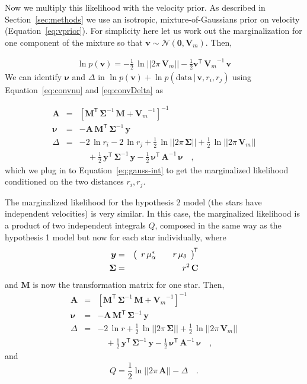 \documentclass[manuscript, letterpaper]{aastex6}
\newcommand{\sectionname}{Section}
\newcommand{\eqname}{Equation}
\newcommand{\given}{\,|\,}
\newcommand{\normal}{{\mathcal{N}}}
\newcommand{\transp}[1]{{#1}^{\!\mathsf{T}}}
\newcommand{\inv}[1]{{#1}^{-1}}
\newcommand{\bs}[1]{\boldsymbol{#1}}
\newcommand{\mat}[1]{\mathbf{#1}}
\renewcommand{\vec}[1]{\bs{#1}}
\newcommand{\data}{\mathrm{data}}
\begin{document}
Now we multiply this likelihood with the velocity prior.
As described in \sectionname~\ref{sec:methods}
we use an isotropic, mixture-of-Gaussians prior on velocity (\eqname~\ref{eq:vprior}).
For simplicity here let us work out the marginalization for one component of
the mixture so that $\vec{v} \sim \normal(\vec{0}, \mat{V}_m)$.
Then,

\begin{eqnarray}
  \ln p(\vec{v}) = -\frac{1}{2}\,\ln||2\pi\,\mat{V}_m||
  -\frac{1}{2} \transp{\vec{v}}\,\inv{\mat{V}_m}\,\vec{v}
\end{eqnarray}
We can identify $\vec{\nu}$ and $\Delta$ in
$\ln p(\vec{v}) + \ln p(\data \given \vec{v}, r_i, r_j)$
using \eqname~\ref{eq:convnu} and \ref{eq:convDelta} as

\begin{eqnarray}
  \mat{A} &=& \inv{[\transp{\mat{M}}\,\inv{\mat{\Sigma}}\,\mat{M}+\inv{\mat{V}_m}]}
  \\
  \vec{\nu} &=& -\mat{A}\,\transp{\mat{M}}\,\inv{\mat{\Sigma}}\,\vec{y}
  \\
  \Delta &=& -2\,\ln r_i -2\,\ln r_j
    +\frac{1}{2}\,\ln||2\pi\,\mat{\Sigma}|| +\frac{1}{2}\,\ln||2\pi\,\mat{V}_m|| \nonumber \\
    && \quad +\frac{1}{2}\,\transp{\vec{y}}\,\inv{\mat{\Sigma}}\,\vec{y} -\frac{1}{2}\,\transp{\vec{\nu}}\,\inv{\mat{A}}\,\vec{\nu}
  \quad ,
\end{eqnarray}
which we plug in to \eqname~\ref{eq:gauss-int} to get the marginalized
likelihood conditioned on the two distances $r_i, r_j$.

The marginalized likelihood for the hypothesis 2 model (the stars have
independent velocities) is very similar.
In this case, the marginalized likelihood is a product of two independent
integrals $Q$, composed in the same way as the hypothesis 1 model but now for
each star individually, where
\begin{eqnarray}
  \vec{y} &=&
    \transp{\left(
      \begin{array}{c c}
        r\,\mu_{\alpha}^* & \quad
        r\,\mu_{\delta}
      \end{array}
    \right)}
  \\
  \mat{\Sigma} &=& r^2 \, \mat{C}
  \\
\end{eqnarray}
and $\mat{M}$ is now the transformation matrix for one star. Then,
\begin{eqnarray}
  \mat{A} &=& \inv{[\transp{\mat{M}}\,\inv{\mat{\Sigma}}\,\mat{M}+\inv{\mat{V}_m}]}
  \\
  \vec{\nu} &=& -\mat{A}\,\transp{\mat{M}}\,\inv{\mat{\Sigma}}\,\vec{y}
  \\
  \Delta &=& -2\,\ln r
    +\frac{1}{2}\,\ln||2\pi\,\mat{\Sigma}|| +\frac{1}{2}\,\ln||2\pi\,\mat{V}_m|| \nonumber \\
    && \quad +\frac{1}{2}\,\transp{\vec{y}}\,\inv{\mat{\Sigma}}\,\vec{y} -\frac{1}{2}\,\transp{\vec{\nu}}\,\inv{\mat{A}}\,\vec{\nu}
  \quad ,
\end{eqnarray}
and
\begin{equation}
  Q = \frac{1}{2}\ln ||2\pi\,\mat{A}|| -\Delta \quad .
\end{equation}
\end{document}
